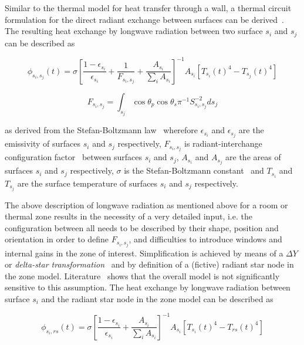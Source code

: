  Similar to the thermal model for heat transfer through a wall, a thermal circuit formulation for the direct radiant exchange between surfaces can be derived~\cite{Buchberg1954,Buchberg1955,Oppenheim1956}. The resulting heat exchange by longwave radiation between two surface $s_{i}$ and $s_{j}$ can be described as

\begin{equation}
\phi_{s_{i},s_{j}}(t)=\sigma \left[\frac{1-\epsilon_{s_{i}}}{\epsilon_{s_{i}}} + \frac{1}{F_{s_{i},s_{j}}} + \frac{A_{s_{i}}}{\sum_{i} A_{s_{i}}}\right]^{-1} A_{s_{i}}\left[T_{s_{i}}(t)^{4}-T_{s_{j}}(t)^{4}\right]
\end{equation}

\begin{equation}
F_{s_{i},s_{j}} = \int_{s_{j}} \cos \theta_{p} \cos \theta_{s} \pi^{-1} S_{s_{i},s_{j}}^{-2} ds_{j}
\end{equation}

as derived from the Stefan-Boltzmann law~\cite{Stefan1879,Boltzmann1884} wherefore $\epsilon_{s_{i}}$ and $\epsilon_{s_{j}}$ are the emissivity of surfaces $s_{i}$ and $s_{j}$ respectively, $F_{s_{i},s_{j}}$ is radiant-interchange configuration factor~\cite{Hamilton1952} between surfaces $s_{i}$ and $s_{j}$, $A_{s_{i}}$ and $A_{s_{j}}$ are the areas of surfaces $s_{i}$ and $s_{j}$ respectively, $\sigma$ is the Stefan-Boltzmann constant~\cite{Mohr2008} and $T_{s_{i}}$ and $T_{s_{j}}$ are the surface temperature of surfaces $s_{i}$ and $s_{j}$ respectively. 

The above description of longwave radiation as mentioned above for a room or thermal zone results in the necessity of a very detailed input, i.e. the configuration between all needs to be described by their shape, position and orientation in order to define $F_{s_{i},s_{j}}$, and difficulties to introduce windows and internal gains in the zone of interest. Simplification is achieved by means of a $\Delta Y$ or \emph{delta-star transformation}~\cite{Kenelly1899} and by definition of a (fictive) radiant star node in the zone model. Literature~\cite{Liesen1997} shows that the overall model is not significantly sensitive to this assumption. The heat exchange by longwave radiation between surface $s_{i}$ and the radiant star node in the zone model can be described as

\begin{equation}
\phi_{s_{i},rs}(t)=\sigma \left[\frac{1-\epsilon_{s_{i}}}{\epsilon_{s_{i}}} + \frac{A_{s_{i}}}{\sum_{i} A_{s_{i}}}\right]^{-1} A_{s_{i}}\left[T_{s_{i}}(t)^{4}-T_{rs}(t)^{4}\right]
\end{equation}

